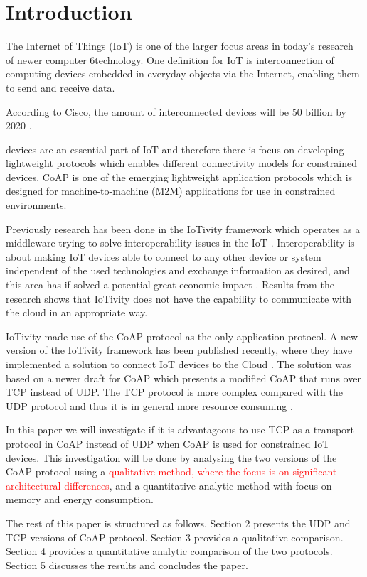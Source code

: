 \section{Introduction}
The Internet of Things (IoT) is one of the larger focus areas in today's research of newer computer 6technology. One definition for IoT is interconnection of computing devices embedded in everyday objects via the Internet, enabling them to send and receive data.

According to Cisco, the amount of interconnected devices will be 50 billion by 2020 \cite{ciscoiot:online} \cite{Inter74:online}.

 devices are an essential part of IoT and therefore there is focus on developing lightweight protocols which enables different connectivity models for constrained devices.  
CoAP is one of the emerging lightweight application protocols which is designed for machine-to-machine (M2M) applications for use in constrained environments.   

Previously research has been done in the IoTivity framework which operates as a middleware trying to solve interoperability issues in the IoT \cite{interoperabilityChallenge}. Interoperability is about making IoT devices able to connect to any other device or system independent of the used technologies and exchange information as desired, and this area has if solved a potential great economic impact \cite{Unloc34:online}. 
Results from the research shows that IoTivity does not have the capability to communicate with the cloud in an appropriate way. 

IoTivity made use of the CoAP protocol as the only application protocol. 
A new version of the IoTivity framework has been published recently, where they have implemented a solution to connect IoT devices to the Cloud \cite{IoTiv3:online}. The solution was based on a newer draft for CoAP \cite{ietf-core-coap-tcp-tls-02} which presents a modified CoAP that runs over TCP instead of UDP.
The TCP protocol is more complex compared with the UDP protocol and thus it is in general more resource consuming \cite{giannoulis2009tcp}.


In this paper we will investigate if it is advantageous to use TCP as a transport protocol in CoAP instead of UDP when CoAP is used for constrained IoT devices. This investigation will be done by analysing the two versions of the CoAP protocol using a \textcolor{red}{qualitative method, where the focus is on significant architectural differences}, and a quantitative analytic method with focus on memory and energy consumption. 

The rest of this paper is structured as follows.  Section 2 presents the UDP and TCP versions of CoAP protocol. Section 3 provides a qualitative comparison. Section 4 provides a quantitative analytic comparison of the two protocols. Section 5 discusses the results and concludes the paper.     
